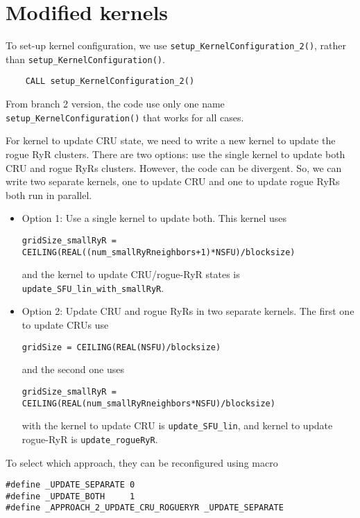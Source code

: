 \section{Modified kernels}
\label{sec:kernel_change_peripheralRyR}

To set-up kernel configuration, we use \verb!setup_KernelConfiguration_2()!,
rather than \verb!setup_KernelConfiguration()!.
\begin{verbatim}
    CALL setup_KernelConfiguration_2()
\end{verbatim}

\begin{framed}
From branch 2 version, the code use only one name
\verb!setup_KernelConfiguration()! that works for all cases. 
\end{framed}

For kernel to update CRU state, we need to write a new kernel to update
the rogue RyR clusters. There are two options: use the single kernel to update
both CRU and rogue RyRs clusters. However, the code can be divergent. So, we can write two separate
kernels, one to update CRU and one to update rogue RyRs both run in parallel. 
\begin{itemize}
  \item Option 1: Use a single kernel to update both. This kernel uses
\begin{verbatim}
gridSize_smallRyR = CEILING(REAL((num_smallRyRneighbors+1)*NSFU)/blocksize)  
\end{verbatim}
and the kernel to update CRU/rogue-RyR states is
\verb!update_SFU_lin_with_smallRyR!.

\item Option 2: Update CRU and rogue RyRs in two separate kernels. The first one
to update CRUs use
\begin{verbatim}
gridSize = CEILING(REAL(NSFU)/blocksize)
\end{verbatim}
and the second one uses
\begin{verbatim}
gridSize_smallRyR = CEILING(REAL(num_smallRyRneighbors*NSFU)/blocksize)
\end{verbatim}
with the kernel to update CRU is \verb!update_SFU_lin!, and kernel to update
rogue-RyR is \verb!update_rogueRyR!. 
\end{itemize}

To select which approach, they can be reconfigured using macro
\begin{verbatim}
#define _UPDATE_SEPARATE 0
#define _UPDATE_BOTH     1
#define _APPROACH_2_UPDATE_CRU_ROGUERYR _UPDATE_SEPARATE
\end{verbatim}

